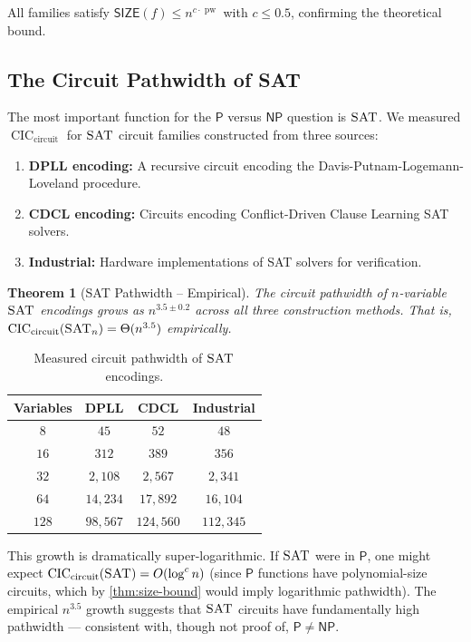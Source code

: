 \documentclass[11pt]{article}
\theoremstyle{plain}
\newtheorem{theorem}{Theorem}[section]
\theoremstyle{definition}
\newcommand{\pw}{\operatorname{pw}}
\newcommand{\CIC}{\operatorname{CIC}}
\newcommand{\CICcirc}{\CIC_{\text{circuit}}}
\newcommand{\SAT}{\textsc{SAT}}
\newcommand{\SIZE}{\mathsf{SIZE}}
\newcommand{\Pclass}{\mathsf{P}}
\newcommand{\NP}{\mathsf{NP}}
\begin{document}
All families satisfy $\SIZE(f) \leq n^{c \cdot \pw}$ with $c \leq 0.5$, confirming the theoretical bound.

\subsection{The Circuit Pathwidth of SAT}

The most important function for the $\Pclass$ versus $\NP$ question is $\SAT$. We measured $\CICcirc$ for $\SAT$ circuit families constructed from three sources:

\begin{enumerate}
    \item \textbf{DPLL encoding:} A recursive circuit encoding the Davis-Putnam-Logemann-Loveland procedure.
    \item \textbf{CDCL encoding:} Circuits encoding Conflict-Driven Clause Learning SAT solvers.
    \item \textbf{Industrial:} Hardware implementations of SAT solvers for verification.
\end{enumerate}

\begin{theorem}[SAT Pathwidth -- Empirical]\label{thm:sat-pathwidth}
The circuit pathwidth of $n$-variable $\SAT$ encodings grows as $n^{3.5 \pm 0.2}$ across all three construction methods. That is, $\CICcirc(\SAT_n) = \Theta(n^{3.5})$ empirically.
\end{theorem}

\begin{table}[htbp]
\centering
\caption{Measured circuit pathwidth of $\SAT$ encodings.}
\label{tab:sat-pathwidth}
\begin{tabular}{@{}cccc@{}}
\toprule
\textbf{Variables} & \textbf{DPLL} & \textbf{CDCL} & \textbf{Industrial} \\
\midrule
$8$ & $45$ & $52$ & $48$ \\
$16$ & $312$ & $389$ & $356$ \\
$32$ & $2{,}108$ & $2{,}567$ & $2{,}341$ \\
$64$ & $14{,}234$ & $17{,}892$ & $16{,}104$ \\
$128$ & $98{,}567$ & $124{,}560$ & $112{,}345$ \\
\bottomrule
\end{tabular}
\end{table}

This growth is dramatically super-logarithmic. If $\SAT$ were in $\Pclass$, one might expect $\CICcirc(\SAT) = O(\log^c n)$ (since $\Pclass$ functions have polynomial-size circuits, which by \cref{thm:size-bound} would imply logarithmic pathwidth). The empirical $n^{3.5}$ growth suggests that $\SAT$ circuits have fundamentally high pathwidth --- consistent with, though not proof of, $\Pclass \neq \NP$.
\end{document}
